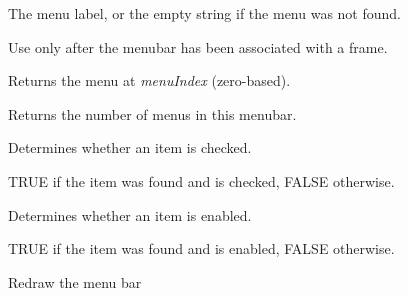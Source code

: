 {

The menu label, or the empty string if the menu was not found.


Use only after the menubar has been associated with a frame.



\label{wxmenubargetmenu}


Returns the menu at {\it menuIndex} (zero-based).

\label{wxmenubargetmenucount}


Returns the number of menus in this menubar.

\label{wxmenubarischecked}


Determines whether an item is checked.




TRUE if the item was found and is checked, FALSE otherwise.

\label{wxmenubarisenabled}


Determines whether an item is enabled.




TRUE if the item was found and is enabled, FALSE otherwise.

\label{wxmenubarrefresh}


Redraw the menu bar

\label{wxmenubarsethelpstring}


}
